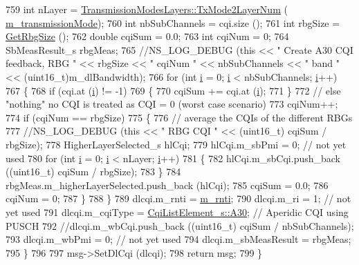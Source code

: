 \begin{DoxyCode}
759       \textcolor{keywordtype}{int} nLayer = \hyperlink{classns3_1_1TransmissionModesLayers_a31f608b7bfaa77440fe4cb85ad035329}{TransmissionModesLayers::TxMode2LayerNum} (
      \hyperlink{classns3_1_1LteUePhy_afdfda099de8075846985a04826875067}{m\_transmissionMode});
760       \textcolor{keywordtype}{int} nbSubChannels = cqi.size ();
761       \textcolor{keywordtype}{int} rbgSize = \hyperlink{classns3_1_1LtePhy_a0b43cc13670b730fce0b55c8e0db60d9}{GetRbgSize} ();
762       \textcolor{keywordtype}{double} cqiSum = 0.0;
763       \textcolor{keywordtype}{int} cqiNum = 0;
764       SbMeasResult\_s rbgMeas;
765       \textcolor{comment}{//NS\_LOG\_DEBUG (this << " Create A30 CQI feedback, RBG " << rbgSize << " cqiNum " << nbSubChannels <<
       " band "  << (uint16\_t)m\_dlBandwidth);}
766       \textcolor{keywordflow}{for} (\textcolor{keywordtype}{int} \hyperlink{bernuolliDistribution_8m_a6f6ccfcf58b31cb6412107d9d5281426}{i} = 0; \hyperlink{bernuolliDistribution_8m_a6f6ccfcf58b31cb6412107d9d5281426}{i} < nbSubChannels; \hyperlink{bernuolliDistribution_8m_a6f6ccfcf58b31cb6412107d9d5281426}{i}++)
767         \{
768           \textcolor{keywordflow}{if} (cqi.at (\hyperlink{bernuolliDistribution_8m_a6f6ccfcf58b31cb6412107d9d5281426}{i}) != -1)
769             \{
770               cqiSum += cqi.at (\hyperlink{bernuolliDistribution_8m_a6f6ccfcf58b31cb6412107d9d5281426}{i});
771             \}
772           \textcolor{comment}{// else "nothing" no CQI is treated as CQI = 0 (worst case scenario)}
773           cqiNum++;
774           \textcolor{keywordflow}{if} (cqiNum == rbgSize)
775             \{
776               \textcolor{comment}{// average the CQIs of the different RBGs}
777               \textcolor{comment}{//NS\_LOG\_DEBUG (this << " RBG CQI "  << (uint16\_t) cqiSum / rbgSize);}
778               HigherLayerSelected\_s hlCqi;
779               hlCqi.m\_sbPmi = 0; \textcolor{comment}{// not yet used}
780               \textcolor{keywordflow}{for} (\textcolor{keywordtype}{int} \hyperlink{bernuolliDistribution_8m_a6f6ccfcf58b31cb6412107d9d5281426}{i} = 0; \hyperlink{bernuolliDistribution_8m_a6f6ccfcf58b31cb6412107d9d5281426}{i} < nLayer; \hyperlink{bernuolliDistribution_8m_a6f6ccfcf58b31cb6412107d9d5281426}{i}++)
781                 \{
782                   hlCqi.m\_sbCqi.push\_back ((uint16\_t) cqiSum / rbgSize);
783                 \}
784               rbgMeas.m\_higherLayerSelected.push\_back (hlCqi);
785               cqiSum = 0.0;
786               cqiNum = 0;
787             \}
788         \}
789       dlcqi.m\_rnti = \hyperlink{classns3_1_1LteUePhy_a887b5dc4e246a308cd09127b64ed8fac}{m\_rnti};
790       dlcqi.m\_ri = 1; \textcolor{comment}{// not yet used}
791       dlcqi.m\_cqiType = \hyperlink{structns3_1_1CqiListElement__s_a8f1bd827fd9842e7c07e39265d88299aab9a9d64494e36c89d7932a00edb056a7}{CqiListElement\_s::A30}; \textcolor{comment}{// Aperidic CQI using PUSCH}
792       \textcolor{comment}{//dlcqi.m\_wbCqi.push\_back ((uint16\_t) cqiSum / nbSubChannels);}
793       dlcqi.m\_wbPmi = 0; \textcolor{comment}{// not yet used}
794       dlcqi.m\_sbMeasResult = rbgMeas;
795     \}
796 
797   msg->SetDlCqi (dlcqi);
798   \textcolor{keywordflow}{return} msg;
799 \}
\end{DoxyCode}


